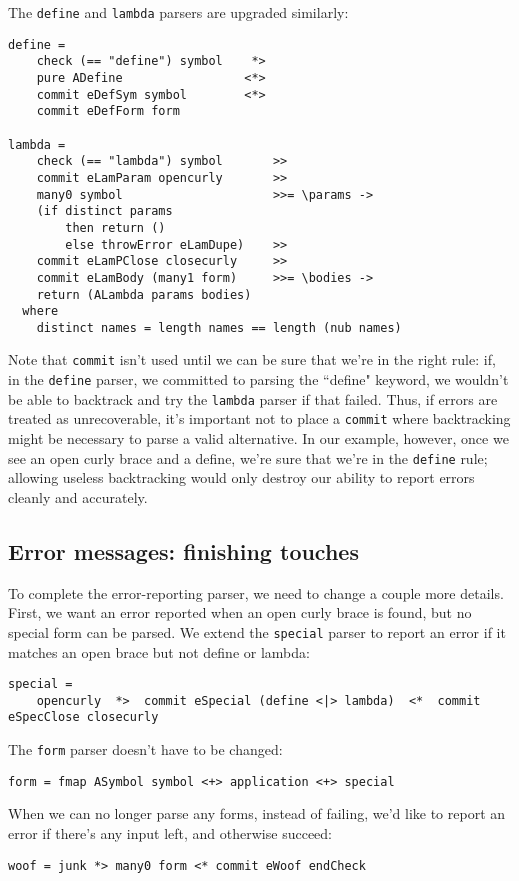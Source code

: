 \documentclass{tmr}
\begin{document}
The \verb+define+ and \verb+lambda+ parsers are upgraded similarly:
\begin{verbatim}
define =
    check (== "define") symbol    *>
    pure ADefine                 <*>
    commit eDefSym symbol        <*>
    commit eDefForm form
    
lambda =
    check (== "lambda") symbol       >>
    commit eLamParam opencurly       >>
    many0 symbol                     >>= \params ->
    (if distinct params 
        then return ()
        else throwError eLamDupe)    >>
    commit eLamPClose closecurly     >>
    commit eLamBody (many1 form)     >>= \bodies ->
    return (ALambda params bodies)
  where
    distinct names = length names == length (nub names)
\end{verbatim}

Note that \verb+commit+ isn't used until we can be sure that we're in the right 
rule:   if, in the \verb+define+ parser, we committed to parsing the ``define" 
keyword, we wouldn't be able to backtrack and try the \verb+lambda+ parser if 
that failed.  Thus, if errors are treated as unrecoverable, it's important not to 
place a \verb+commit+ where backtracking might be necessary to parse a valid 
alternative.  In our example, however, once 
we see an open curly brace and a define, we're sure that we're in the \verb+define+
rule; allowing useless backtracking would only destroy our ability to report 
errors cleanly and accurately.

\subsection{Error messages:  finishing touches}
To complete the error-reporting parser, we need to change a couple more details. 
First, we want an error reported when an open curly brace is found, but no 
special form can be parsed.  We extend the \verb+special+ 
parser to report an error if it matches an open brace but not define or lambda:
\begin{verbatim}
special = 
    opencurly  *>  commit eSpecial (define <|> lambda)  <*  commit eSpecClose closecurly
\end{verbatim}

The \verb+form+ parser doesn't have to be changed:
\begin{verbatim}
form = fmap ASymbol symbol <+> application <+> special
\end{verbatim}

When we can no longer parse any forms, instead of failing, we'd like to report 
an error if there's any input left, and otherwise succeed:
\begin{verbatim}
woof = junk *> many0 form <* commit eWoof endCheck
\end{verbatim}
\end{document}
